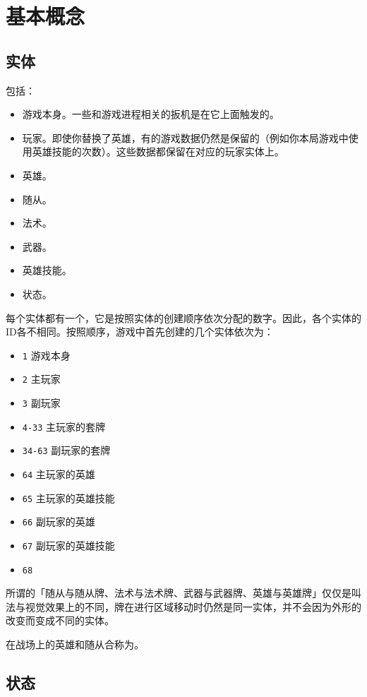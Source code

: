 \chapter{基本概念}
\label{basic-concept}

\section{实体}
\label{entity}

包括：
\begin{itemize}
    \item 游戏本身。一些和游戏进程相关的扳机是在它上面触发的。
    \item 玩家。即使你替换了英雄，有的游戏数据仍然是保留的（例如你本局游戏中使用英雄技能的次数）。这些数据都保留在对应的玩家实体上。
    \item 英雄。
    \item 随从。
    \item 法术。
    \item 武器。
    \item 英雄技能。
    \item 状态。
\end{itemize}

每个实体都有一个，它是按照实体的创建顺序依次分配的数字。因此，各个实体的ID各不相同。按照顺序，游戏中首先创建的几个实体依次为：
\begin{itemize}
    \item \texttt{1} 游戏本身
    \item \texttt{2} 主玩家
    \item \texttt{3} 副玩家
    \item \texttt{4-33} 主玩家的套牌
    \item \texttt{34-63} 副玩家的套牌
    \item \texttt{64} 主玩家的英雄
    \item \texttt{65} 主玩家的英雄技能
    \item \texttt{66} 副玩家的英雄
    \item \texttt{67} 副玩家的英雄技能
    \item \texttt{68} 
\end{itemize}

\notice 所谓的「随从与随从牌、法术与法术牌、武器与武器牌、英雄与英雄牌」仅仅是叫法与视觉效果上的不同，牌在进行区域移动时仍然是同一实体，并不会因为外形的改变而变成不同的实体。

在战场上的英雄和随从合称为。

\section{状态}
\label{enchantment}

